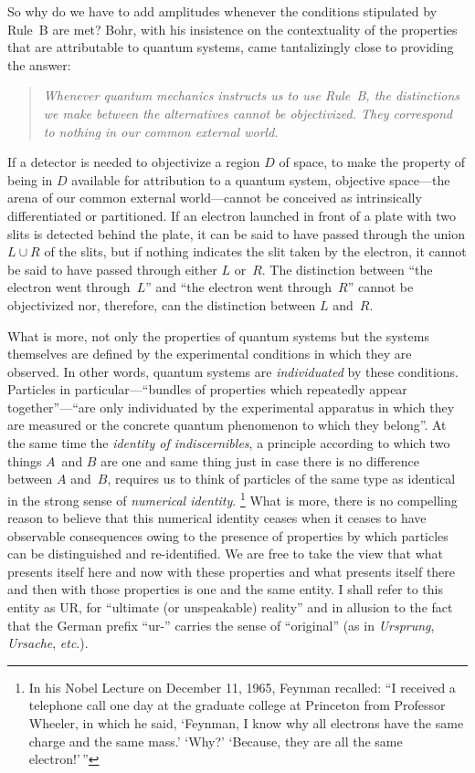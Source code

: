 \documentclass[smallextended]{svjour3}
\newcommand{\bq}{\begin{quote}}
\newcommand{\eq}{\end{quote}}
\begin{document}
So why do we have to add amplitudes whenever the conditions stipulated by Rule~B are met? Bohr, with his insistence on the contextuality of the properties that are attributable to quantum systems, came tantalizingly close to providing the answer: 
\bq
\emph{Whenever quantum mechanics instructs us to use Rule~B, the distinctions we make between the alternatives cannot be objectivized. They correspond to nothing in our common external world.}
\eq
If a detector is needed to objectivize a region $D$ of space, to make the property of being in $D$ available for attribution to a quantum system, objective space---the arena of our common external world---cannot be conceived as {intrinsically} differentiated or partitioned. If an electron launched in front of a plate with two slits is detected behind the plate, it can be said to have passed through the union $L\cup R$ of the slits, but if nothing indicates the slit taken by the electron, it cannot be said to have passed through either $L$ or~$R$. The distinction between ``the electron went through~$L$'' and ``the electron went through~$R$'' cannot be objectivized nor, therefore, can the distinction between $L$ and~$R$.

What is more, not only the properties of quantum systems but the systems themselves are defined by the experimental conditions in which they are observed. In other words, quantum systems are \emph{individuated} by these conditions. Particles in particular---``bundles of properties which repeatedly appear together''---``are only individuated by the experimental apparatus in which they are measured or the concrete quantum phenomenon to which they belong''.\cite{Falk2007b} At the same time the \textit{identity of indiscernibles}, a principle according to which two things $A$~and $B$ are one and same thing just in case there is no difference between $A$ and~$B$, requires us to think of particles of the same type as identical in the strong sense of \emph{numerical identity}.%
\footnote{In his Nobel Lecture  on December 11, 1965, Feynman recalled: ``I received a telephone call one day at the graduate college at Princeton from Professor Wheeler, in which he said, `Feynman, I know why all electrons have the same charge and the same mass.' `Why?' `Because, they are all the same electron!'\,''}
What is more, there is no compelling reason to believe that this {numerical} identity ceases when it ceases to have observable consequences owing to the presence of properties by which particles can be distinguished and re-identified. We are free to take the view that what presents itself here and now with these properties and what presents itself there and then with those properties is one and the same entity. I shall refer to this entity as UR, for ``ultimate (or unspeakable) reality'' and in allusion to the fact that the German prefix ``ur-'' carries the sense of ``original'' (as in \emph{Ursprung}, \emph{Ursache}, \emph{etc}.). 
\end{document}
